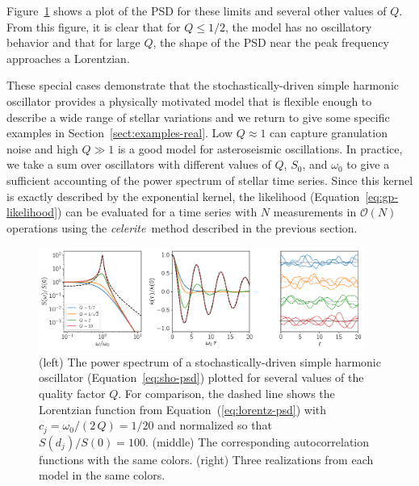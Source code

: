 \documentclass[manuscript, letterpaper]{aastex6}
\makeatletter
\let\origsection\section
\renewcommand\section{\@ifstar{\starsection}{\nostarsection}}
\newcommand\nostarsection[1]{\sectionprelude\origsection{#1}}
\newcommand\starsection[1]{\sectionprelude\origsection*{#1}}
\newcommand\sectionprelude{\vspace{1em}}
\newcommand{\celeriteterm}{\emph{celerite}}
\newcommand{\figureref}[1]{\ref{fig:#1}}
\newcommand{\Figure}[1]{Figure~\figureref{#1}}
\newcommand{\figurelabel}[1]{\label{fig:#1}}
\renewcommand{\eqref}[1]{\ref{eq:#1}}
\newcommand{\Eq}[1]{Equation~(\eqref{#1})}
\newcommand{\eq}[1]{\Eq{#1}}
\newcommand{\eqalt}[1]{Equation~\eqref{#1}}
\newcommand{\sectionname}{Section}
\newcommand{\sectref}[1]{\ref{sect:#1}}
\newcommand{\Sect}[1]{\sectionname~\sectref{#1}}
\newcommand{\sect}[1]{\Sect{#1}}
\newcommand{\response}[1]{{\color{blue}#1}}
\makeatother
\begin{document}
\Figure{sho} shows a plot of the PSD for these limits and several other values
of $Q$.
From this figure, it is clear that for $Q \le 1/2$, the model has no
oscillatory behavior and that for large $Q$, the shape of the PSD near the
peak frequency approaches a Lorentzian.

These special cases demonstrate that the stochastically-driven simple harmonic
oscillator provides a physically motivated model that is flexible enough to
describe a wide range of stellar variations and we return to give some
specific examples in \sect{examples-real}.
Low $Q \approx 1$ can capture granulation noise and high $Q \gg 1$ is a good
model for asteroseismic oscillations.
In practice, we take a sum over oscillators with different values of $Q$,
$S_0$, and $\omega_0$ to give a sufficient accounting of the power spectrum
of stellar time series.
Since this kernel is exactly described by the exponential kernel, the
likelihood (\eqalt{gp-likelihood}) can be evaluated for a time series with $N$
measurements in $\mathcal{O}(N)$ operations using the \celeriteterm\ method
described in the previous section.

\begin{figure}[!htbp]
\begin{center}
\includegraphics[width=0.95\textwidth]{figures/sho.pdf}
\caption{(left) The power spectrum of a stochastically-driven simple harmonic
    oscillator (\eqalt{sho-psd}) plotted for several values of the quality
    factor $Q$.
    For comparison, the dashed line shows the Lorentzian function from
    \eq{lorentz-psd} with $c_j = \omega_0/(2\,Q) = 1/20$ and normalized so that
    $S(d_j)/S(0) = 100$.
    (middle) The corresponding autocorrelation functions with the same colors.
    \response{(right) Three realizations from each model in the same colors.}
    \figurelabel{sho}}
\end{center}
\end{figure}


\section{Examples}
\end{document}
